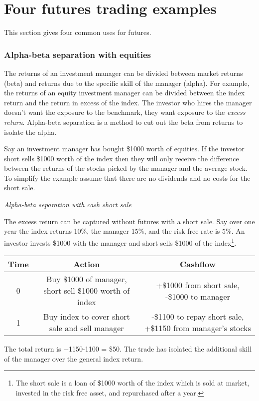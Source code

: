 \documentclass{tran-l}
\theoremstyle{definition}
\theoremstyle{remark}
\numberwithin{equation}{subsection}
\begin{document}
\section{Four futures trading examples}

This section gives four common uses for futures. 

\subsubsection{Alpha-beta separation with equities}

The returns of an investment manager can be divided between market returns (beta) and returns due to the specific skill of the manager (alpha). For example, the returns of an equity investment manager can be divided between the index return and the return in excess of the index. The investor who hires the manager doesn't want the exposure to the benchmark, they want exposure to the \textit{excess return}. Alpha-beta separation is a method to cut out the beta from returns to isolate the alpha.

Say an investment manager has bought \$1000 worth of equities. If the investor short sells \$1000 worth of the index then they will only receive the difference between the returns of the stocks picked by the manager and the average stock. To simplify the example assume that there are no dividends and no costs for the short sale.


\textit{Alpha-beta separation with cash short sale}

The excess return can be captured without futures with a short sale. Say over one year the index returns 10\%, the manager 15\%, and the risk free rate is 5\%. An investor invests \$1000 with the manager and short sells \$1000 of the index\footnote{The short sale is a loan of \$1000 worth of the index which is sold at market, invested in the risk free asset, and repurchased after a year.}.


\begin{tabular}{|ccc|}
\hline
Time & Action & Cashflow\\
\hline
0 & Buy \$1000 of manager, short sell \$1000 worth of index & +\$1000 from short sale, -\$1000 to manager\\
1 & Buy index to cover short sale and sell manager & -\$1100 to repay short sale, +\$1150 from manager's stocks\\
\hline
\end{tabular}

The total return is +1150-1100 = \$50. The trade has isolated the additional skill of the manager over the general index return. 
\end{document}
